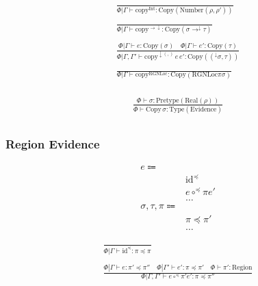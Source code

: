 \documentclass {article}
\begin{document}
\begin{gather*}
\frac
{}
{\Phi | \Gamma \vdash \text{copy}^\text{Int}  : \text{Copy} (\text{Number} (\rho, \rho'))} \\
\\
\frac
{}
{\Phi | \Gamma \vdash \text{copy}^{\to\downarrow} : \text{Copy} (\sigma \to^\downarrow \tau)} \\
\\
\frac
{\Phi | \Gamma \vdash e : \text{Copy} (\sigma) \quad \Phi | \Gamma \vdash e' : \text{Copy} (\tau)}
{\Phi | \Gamma, \Gamma' \vdash \text{copy}^{\downarrow(,)} \, e \, e' : \text{Copy} ((^\downarrow\sigma, \tau))} \\
\\
\frac
{}
{\Phi | \Gamma \vdash \text{copy}^\text{RGNLoc} : \text{Copy} (\text{RGNLoc} \pi \sigma)} \\
\end{gather*}

\begin{gather*}
\frac
{\Phi \vdash \sigma : \text{Pretype}(\text{Real}(\rho))}
{\Phi \vdash \text{Copy} \, \sigma : \text{Type}(\text{Evidence})} \\
\end{gather*}


\subsubsection{Region Evidence}
\begin{align*}
e \Coloneqq & \\
& \text{id}^\preceq \tag{SubType Identity Proof} \\
& e \circ^\preceq \pi e' \tag{SubType Compose Proof} \\
& \dots \\
\sigma, \tau, \pi \Coloneqq & \\
& \pi \preceq \pi' \tag{Region Scoping} \\
& \dots
\end{align*}

\begin{gather*}
\frac
{}
{\Phi | \Gamma \vdash \text{id}^{\preceq}  : \pi \preceq \pi} \\
\\
\frac
{\Phi | \Gamma \vdash e : \pi' \preceq \pi'' \quad \Phi | \Gamma' \vdash e' : \pi \preceq \pi' \quad \Phi \vdash \pi' : \text{Region}}
{\Phi | \Gamma, \Gamma' \vdash e \circ^\preceq \pi' e' : \pi \preceq \pi''} \\
\end{gather*}
\end{document}
